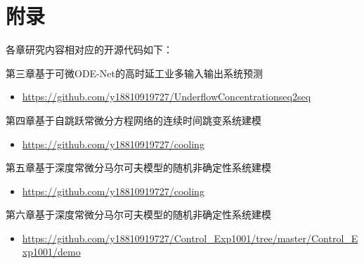 
\chapter*{\centering 附录}
各章研究内容相对应的开源代码如下：

第三章基于可微ODE-Net的高时延工业多输入输出系统预测
\begin{itemize}
\item \href{https://github.com/y18810919727/UnderflowConcentrationseq2seq}{https://github.com/y18810919727/UnderflowConcentrationseq2seq}
\end{itemize}

第四章基于自跳跃常微分方程网络的连续时间跳变系统建模
\begin{itemize}
\item \href{https://github.com/y18810919727/cooling}{https://github.com/y18810919727/cooling}
\end{itemize}


第五章基于深度常微分马尔可夫模型的随机非确定性系统建模
\begin{itemize}
\item \href{https://github.com/y18810919727/cooling}{https://github.com/y18810919727/cooling}
\end{itemize}

第六章基于深度常微分马尔可夫模型的随机非确定性系统建模
\begin{itemize}
    \item \href{https://github.com/y18810919727/Control\_Exp1001/tree/master/Control\_Exp1001/demo}{https://github.com/y18810919727/Control\_Exp1001/tree/master/Control\_Exp1001/demo}
\end{itemize}
